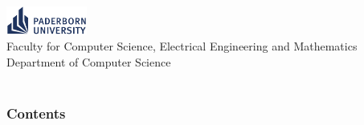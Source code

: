 \documentclass[13pt,t]{beamer}
\begin{document}
	\title{\Title}
	\subtitle{\ThesisType}
	\date{\DateOfSubmission}
	\author{\Author}

	\begin{frame}
		\titlepage

		\begin{center}
			\includegraphics[width=100px]{../figures/logo}
			~ \\
			Faculty for Computer Science, Electrical Engineering and Mathematics \\
			Department of Computer Science \\
			\ResearchGroup \\
			\Address
		\end{center}
	\end{frame}

	\begin{frame}
		\frametitle{Contents}
		\tableofcontents
	\end{frame}

	
\end{document}
